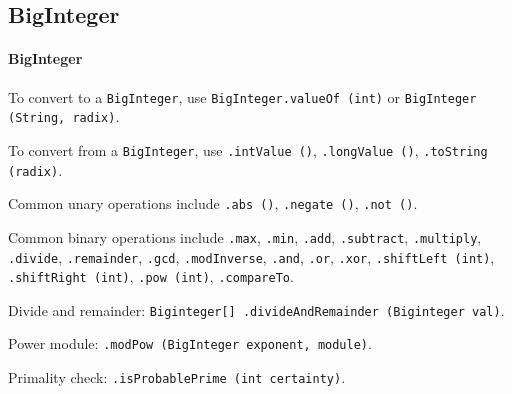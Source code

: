 	\subsection{BigInteger}
	\paragraph{BigInteger}
To convert to a \texttt{BigInteger}, use \texttt{BigInteger.valueOf (int)} or \texttt{BigInteger (String, radix)}.

To convert from a \texttt{BigInteger}, use \texttt{.intValue ()}, \texttt{.longValue ()}, \texttt{.toString (radix)}.

Common unary operations include \texttt{.abs ()}, \texttt{.negate ()}, \texttt{.not ()}.

Common binary operations include \texttt{.max}, \texttt{.min}, \texttt{.add}, \texttt{.subtract}, \texttt{.multiply}, \texttt{.divide}, \texttt{.remainder}, \texttt{.gcd}, \texttt{.modInverse}, \texttt{.and}, \texttt{.or}, \texttt{.xor}, \texttt{.shiftLeft (int)}, \texttt{.shiftRight (int)}, \texttt{.pow (int)}, \texttt{.compareTo}.

Divide and remainder: \texttt{Biginteger[] .divideAndRemainder (Biginteger val)}.

Power module: \texttt{.modPow (BigInteger exponent, module)}.

Primality check: \texttt{.isProbablePrime (int certainty)}.\newline

